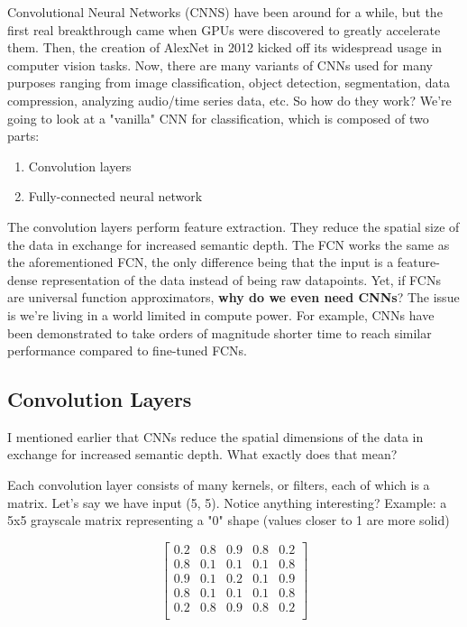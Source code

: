 \documentclass[12pt]{article}
\begin{document}
Convolutional Neural Networks (CNNS) have been around for a while, but the first real breakthrough came when GPUs were discovered to greatly accelerate them. Then, the creation of AlexNet in 2012 kicked off its widespread usage in computer vision tasks. Now, there are many variants of CNNs used for many purposes ranging from image classification, object detection, segmentation, data compression, analyzing audio/time series data, etc. So how do they work? We're going to look at a "vanilla" CNN for classification, which is composed of two parts:

\begin{enumerate}
  \item Convolution layers
  \item Fully-connected neural network
\end{enumerate}

The convolution layers perform feature extraction. They reduce the spatial size of the data in exchange for increased semantic depth. The FCN works the same as the aforementioned FCN, the only difference being that the input is a feature-dense representation of the data instead of being raw datapoints. Yet, if FCNs are universal function approximators, \textbf{why do we even need CNNs}? The issue is we're living in a world limited in compute power. For example, CNNs have been demonstrated to take orders of magnitude shorter time to reach similar performance compared to fine-tuned FCNs. 

\subsection{Convolution Layers}
I mentioned earlier that CNNs reduce the spatial dimensions of the data in exchange for increased semantic depth. What exactly does that mean? 

Each convolution layer consists of many kernels, or filters, each of which is a matrix. Let's say we have input (5, 5). Notice anything interesting? Example: a 5x5 grayscale matrix representing a "0" shape (values closer to 1 are more solid)

\[
\begin{bmatrix}
0.2 & 0.8 & 0.9 & 0.8 & 0.2 \\
0.8 & 0.1 & 0.1 & 0.1 & 0.8 \\
0.9 & 0.1 & 0.2 & 0.1 & 0.9 \\
0.8 & 0.1 & 0.1 & 0.1 & 0.8 \\
0.2 & 0.8 & 0.9 & 0.8 & 0.2 \\
\end{bmatrix}
\]
\end{document}
